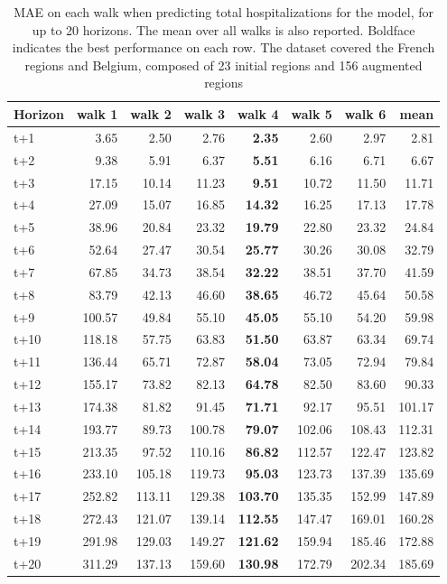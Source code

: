 \begin{table}[H]
\centering
\caption{MAE on each walk when predicting total hospitalizations for the model, for up to 20 horizons. The mean over all walks is also reported. Boldface indicates the best performance on each row. The dataset covered the French regions and Belgium, composed of 23 initial regions and 156 augmented regions }
\label{tab:MAE_walk_custom_linear_regression}
\begin{tabular}{lrrrrrrr}
\toprule
Horizon &  walk 1 &  walk 2 &  walk 3 &  walk 4 &  walk 5 &  walk 6 &   mean \\
\midrule
t+1  & 3.65  & 2.50  & 2.76  & \textbf{2.35}  & 2.60  & 2.97  & 2.81  \\
t+2  & 9.38  & 5.91  & 6.37  & \textbf{5.51}  & 6.16  & 6.71  & 6.67  \\
t+3  & 17.15  & 10.14  & 11.23  & \textbf{9.51}  & 10.72  & 11.50  & 11.71  \\
t+4  & 27.09  & 15.07  & 16.85  & \textbf{14.32}  & 16.25  & 17.13  & 17.78  \\
t+5  & 38.96  & 20.84  & 23.32  & \textbf{19.79}  & 22.80  & 23.32  & 24.84  \\
t+6  & 52.64  & 27.47  & 30.54  & \textbf{25.77}  & 30.26  & 30.08  & 32.79  \\
t+7  & 67.85  & 34.73  & 38.54  & \textbf{32.22}  & 38.51  & 37.70  & 41.59  \\
t+8  & 83.79  & 42.13  & 46.60  & \textbf{38.65}  & 46.72  & 45.64  & 50.58  \\
t+9  & 100.57  & 49.84  & 55.10  & \textbf{45.05}  & 55.10  & 54.20  & 59.98  \\
t+10  & 118.18  & 57.75  & 63.83  & \textbf{51.50}  & 63.87  & 63.34  & 69.74  \\
t+11  & 136.44  & 65.71  & 72.87  & \textbf{58.04}  & 73.05  & 72.94  & 79.84  \\
t+12  & 155.17  & 73.82  & 82.13  & \textbf{64.78}  & 82.50  & 83.60  & 90.33  \\
t+13  & 174.38  & 81.82  & 91.45  & \textbf{71.71}  & 92.17  & 95.51  & 101.17  \\
t+14  & 193.77  & 89.73  & 100.78  & \textbf{79.07}  & 102.06  & 108.43  & 112.31  \\
t+15  & 213.35  & 97.52  & 110.16  & \textbf{86.82}  & 112.57  & 122.47  & 123.82  \\
t+16  & 233.10  & 105.18  & 119.73  & \textbf{95.03}  & 123.73  & 137.39  & 135.69  \\
t+17  & 252.82  & 113.11  & 129.38  & \textbf{103.70}  & 135.35  & 152.99  & 147.89  \\
t+18  & 272.43  & 121.07  & 139.14  & \textbf{112.55}  & 147.47  & 169.01  & 160.28  \\
t+19  & 291.98  & 129.03  & 149.27  & \textbf{121.62}  & 159.94  & 185.46  & 172.88  \\
t+20  & 311.29  & 137.13  & 159.60  & \textbf{130.98}  & 172.79  & 202.34  & 185.69  \\

\bottomrule
\end{tabular}
\end{table}
